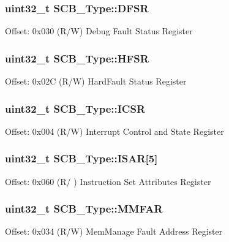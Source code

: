 \subsubsection[{\texorpdfstring{D\+F\+SR}{DFSR}}]{ uint32\+\_\+t S\+C\+B\+\_\+\+Type\+::\+D\+F\+SR}\hypertarget{struct_s_c_b___type_ad7d61d9525fa9162579c3da0b87bff8d}{}\label{struct_s_c_b___type_ad7d61d9525fa9162579c3da0b87bff8d}
Offset\+: 0x030 (R/W) Debug Fault Status Register 
\subsubsection[{\texorpdfstring{H\+F\+SR}{HFSR}}]{ uint32\+\_\+t S\+C\+B\+\_\+\+Type\+::\+H\+F\+SR}\hypertarget{struct_s_c_b___type_a7bed53391da4f66d8a2a236a839d4c3d}{}\label{struct_s_c_b___type_a7bed53391da4f66d8a2a236a839d4c3d}
Offset\+: 0x02C (R/W) Hard\+Fault Status Register 
\subsubsection[{\texorpdfstring{I\+C\+SR}{ICSR}}]{ uint32\+\_\+t S\+C\+B\+\_\+\+Type\+::\+I\+C\+SR}\hypertarget{struct_s_c_b___type_a3e66570ab689d28aebefa7e84e85dc4a}{}\label{struct_s_c_b___type_a3e66570ab689d28aebefa7e84e85dc4a}
Offset\+: 0x004 (R/W) Interrupt Control and State Register 
\subsubsection[{\texorpdfstring{I\+S\+AR}{ISAR}}]{ uint32\+\_\+t S\+C\+B\+\_\+\+Type\+::\+I\+S\+AR\mbox{[}5\mbox{]}}\hypertarget{struct_s_c_b___type_acee8e458f054aac964268f4fe647ea4f}{}\label{struct_s_c_b___type_acee8e458f054aac964268f4fe647ea4f}
Offset\+: 0x060 (R/ ) Instruction Set Attributes Register 
\subsubsection[{\texorpdfstring{M\+M\+F\+AR}{MMFAR}}]{ uint32\+\_\+t S\+C\+B\+\_\+\+Type\+::\+M\+M\+F\+AR}\hypertarget{struct_s_c_b___type_ac49b24b3f222508464f111772f2c44dd}{}\label{struct_s_c_b___type_ac49b24b3f222508464f111772f2c44dd}
Offset\+: 0x034 (R/W) Mem\+Manage Fault Address Register 
